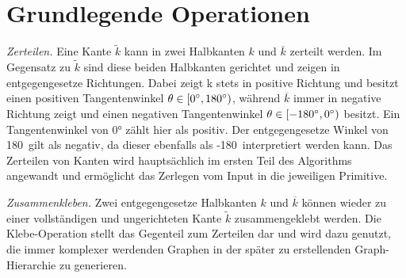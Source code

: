 
\section{Grundlegende Operationen}
\textit{Zerteilen.} Eine Kante \(\tilde{k}\) kann in zwei Halbkanten \(k\) und \(\overline{k}\) zerteilt werden. Im Gegensatz zu \(\tilde{k}\)
sind diese beiden Halbkanten gerichtet und zeigen in entgegengesetze Richtungen. Dabei zeigt k stets in positive Richtung und besitzt einen
positiven Tangentenwinkel \(\theta \in [0\degree,180\degree) \), während \(\overline{k}\) immer in negative Richtung zeigt und einen negativen
Tangentenwinkel \(\theta \in [-180\degree,0\degree) \) besitzt. Ein Tangentenwinkel von 0° zählt hier als positiv. Der entgegengesetze Winkel
von 180\degree\ gilt als negativ, da dieser ebenfalls als -180\degree\ interpretiert werden kann. Das Zerteilen von Kanten wird hauptsächlich im
ersten Teil des Algorithms angewandt und ermöglicht das Zerlegen vom Input in die jeweiligen Primitive.

\textit{Zusammenkleben.} Zwei entgegengesetze Halbkanten \(k\) und \(\overline{k}\) können wieder zu einer vollständigen und ungerichteten Kante
\(\tilde{k}\) zusammengeklebt werden. Die Klebe-Operation stellt das Gegenteil zum Zerteilen dar und wird dazu genutzt, die immer komplexer
werdenden Graphen in der später zu erstellenden Graph-Hierarchie zu generieren.
